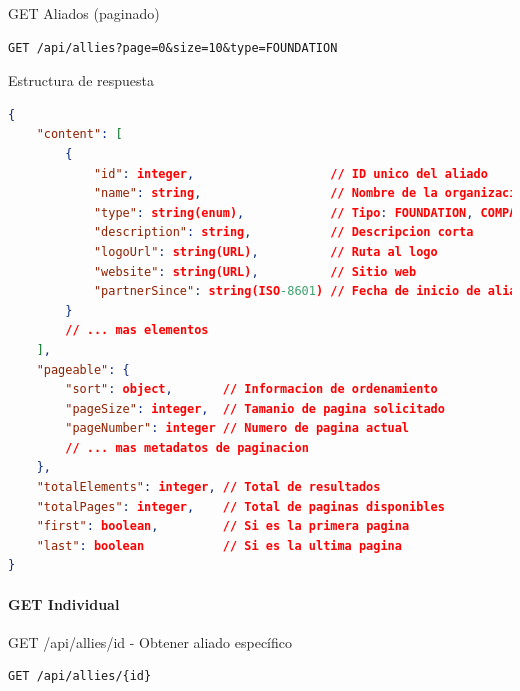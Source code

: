 \documentclass[11pt,a4paper]{article}
\begin{document}
\begin{center}
	\begin{minipage}{\textwidth}
		\begin{codebox}{GET Aliados (paginado)}
			\begin{lstlisting}[language=HTTP]
GET /api/allies?page=0&size=10&type=FOUNDATION
\end{lstlisting}
		\end{codebox}
	\end{minipage}
\end{center}

\begin{center}
	\begin{minipage}{\textwidth}
		\begin{codebox}{Estructura de respuesta}
			\begin{lstlisting}[language=json]
{
    "content": [
        {
            "id": integer,                   // ID unico del aliado
            "name": string,                  // Nombre de la organizacion
            "type": string(enum),            // Tipo: FOUNDATION, COMPANY, NGO, etc.
            "description": string,           // Descripcion corta
            "logoUrl": string(URL),          // Ruta al logo
            "website": string(URL),          // Sitio web
            "partnerSince": string(ISO-8601) // Fecha de inicio de alianza
        }
        // ... mas elementos
    ],
    "pageable": {
        "sort": object,       // Informacion de ordenamiento
        "pageSize": integer,  // Tamanio de pagina solicitado
        "pageNumber": integer // Numero de pagina actual
        // ... mas metadatos de paginacion
    },
    "totalElements": integer, // Total de resultados
    "totalPages": integer,    // Total de paginas disponibles
    "first": boolean,         // Si es la primera pagina
    "last": boolean           // Si es la ultima pagina
}
\end{lstlisting}
		\end{codebox}
	\end{minipage}
\end{center}

\paragraph{GET Individual}

\begin{center}
	\begin{minipage}{\textwidth}
		\begin{codebox}{GET /api/allies/{id} - Obtener aliado específico}
			\begin{lstlisting}[language=HTTP]
GET /api/allies/{id}
\end{lstlisting}
		\end{codebox}
	\end{minipage}
\end{center}
\end{document}
